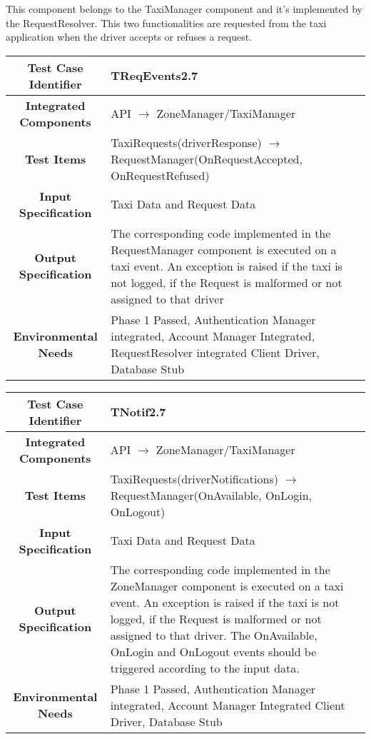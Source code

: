\documentclass[11pt, a4paper,titlepage]{article}
\begin{document}
	 	This component belongs to the TaxiManager component and it's implemented by the RequestResolver. This two functionalities are requested from the taxi application when the driver accepts or refuses a request.
	 \begin{tabularx}{\textwidth}{| c|X|}
	 	\hline \textbf{Test Case Identifier} & TReqEvents2.7\\
	 	\hline \textbf{Integrated Components} & API  $\rightarrow $  ZoneManager/TaxiManager \\
	 	\hline \textbf{Test Items} & TaxiRequests(driverResponse) $\rightarrow $ RequestManager(OnRequestAccepted, OnRequestRefused) \\
	 	\hline \textbf{Input Specification} & Taxi Data and Request Data \\
	 	\hline \textbf{Output Specification} & The corresponding code implemented in the RequestManager component is executed on a taxi event. \newline An exception is raised if the taxi is not logged, if the Request is malformed or not assigned to that driver \\
	 	\hline \textbf{Environmental Needs} &  Phase 1 Passed, Authentication Manager integrated, Account Manager Integrated, RequestResolver integrated \newline 
	 	Client Driver, Database Stub\\
	 	\hline
	 \end{tabularx}
	 \newline	
	 	
	 \begin{tabularx}{\textwidth}{| c|X|}
			 	\hline \textbf{Test Case Identifier} & TNotif2.7\\
			 	\hline \textbf{Integrated Components} & API  $\rightarrow $  ZoneManager/TaxiManager \\
			 	\hline \textbf{Test Items} & TaxiRequests(driverNotifications) $\rightarrow $ RequestManager(OnAvailable, OnLogin, OnLogout) \\
			 	\hline \textbf{Input Specification} & Taxi Data and Request Data \\
			 	\hline \textbf{Output Specification} & The corresponding code implemented in the ZoneManager component is executed on a taxi event. \newline An exception is raised if the taxi is not logged, if the Request is malformed or not assigned to that driver. \newline
			 	The OnAvailable, OnLogin and OnLogout events should be triggered according to the input data. \\
			 	\hline \textbf{Environmental Needs} &  Phase 1 Passed, Authentication Manager integrated, Account Manager Integrated \newline 
			 	Client Driver, Database Stub\\
			 	\hline
	 \end{tabularx}
	 \newline
	 
\end{document}
